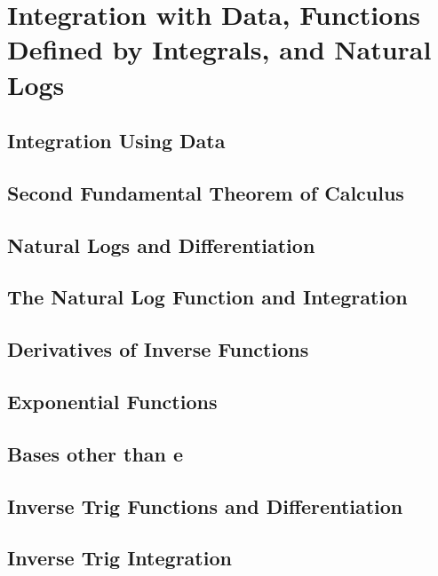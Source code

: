 \documentclass[../bccalc.tex]{subfiles}
\begin{document}
\chapter{Integration with Data, Functions Defined by Integrals, and Natural Logs}
\section{Integration Using Data}

\section{Second Fundamental Theorem of Calculus}

\section{Natural Logs and Differentiation}

\section{The Natural Log Function and Integration}

\section{Derivatives of Inverse Functions}

\section{Exponential Functions}

\section{Bases other than e}

\section{Inverse Trig Functions and Differentiation}

\section{Inverse Trig Integration}
\end{document}
